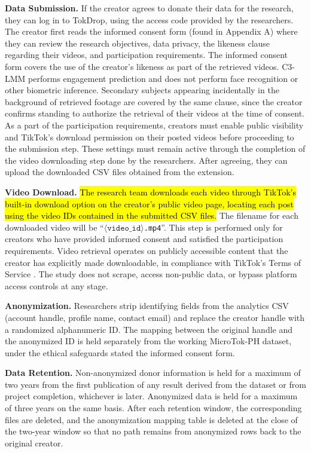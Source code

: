 \textbf{Data Submission.} If the creator agrees to donate their data for the research, they can log in to TokDrop, using the access code provided by the researchers. The creator first reads the informed consent form (found in Appendix A) where they can review the research objectives, data privacy, the likeness clause regarding their videos, and participation requirements. The informed consent form covers the use of the creator's likeness as part of the retrieved videos. C3-LMM performs engagement prediction and does not perform face recognition or other biometric inference. Secondary subjects appearing incidentally in the background of retrieved footage are covered by the same clause, since the creator confirms standing to authorize the retrieval of their videos at the time of consent. As a part of the participation requirements, creators must enable public visibility and TikTok's download permission on their posted videos before proceeding to the submission step. These settings must remain active through the completion of the video downloading step done by the researchers. After agreeing, they can upload the downloaded CSV files obtained from the extension.

\textbf{Video Download.} \hl{The research team downloads each video through TikTok's built-in download option on the creator's public video page, locating each post using the video IDs contained in the submitted CSV files.} The filename for each downloaded video will be ``$\langle \texttt{video\_id}\rangle$\texttt{.mp4}''. This step is performed only for creators who have provided informed consent and satisfied the participation requirements. Video retrieval operates on publicly accessible content that the creator has explicitly made downloadable, in compliance with TikTok's Terms of Service \cite{tiktok_tos_2026}. The study does not scrape, access non-public data, or bypass platform access controls at any stage.

\textbf{Anonymization.} Researchers strip identifying fields from the analytics CSV (account handle, profile name, contact email) and replace the creator handle with a randomized alphanumeric ID. The mapping between the original handle and the anonymized ID is held separately from the working MicroTok-PH dataset, under the ethical safeguards stated the informed consent form.

\textbf{Data Retention.} Non-anonymized donor information is held for a maximum of two years from the first publication of any result derived from the dataset or from project completion, whichever is later. Anonymized data is held for a maximum of three years on the same basis. After each retention window, the corresponding files are deleted, and the anonymization mapping table is deleted at the close of the two-year window so that no path remains from anonymized rows back to the original creator.

